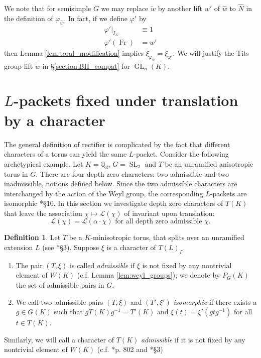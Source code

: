\documentclass{amsart}
\theoremstyle{plain}
\theoremstyle{definition}
\newtheorem{definition}[theorem]{Definition}
\numberwithin{equation}{section}
\DeclareMathOperator{\Fr}{Fr}
\DeclareMathOperator{\GL}{GL}
\DeclareMathOperator{\SL}{SL}
\newcommand{\QQ}{\mathbb{Q}}
\newcommand{\Lpack}{\mathcal{L}}
\begin{document}
We note that for semisimple $G$ we may replace $\tilde{w}$ by another
lift $w'$ of $\hat{w}$ to $\hat{N}$ in the definition of $\varphi_{\hat{w}}$.
In fact, if we define $\varphi'$ by
\begin{align*}
\varphi'|_{I_K} &\equiv 1 \\
\varphi'(\Fr) &= w'
\end{align*}
then Lemma \ref{lem:toral_modification} implies $\xi_{\varphi_{\hat{w}}} = \xi_{\varphi'}$.
We will justify the Tits group lift $\tilde{w}$ in \S\ref{section:BH_compat} for $\GL_n(K)$.

\section{$L$-packets fixed under translation by a character}\label{Q_T}

The general definition of rectifier is complicated by the fact that different
characters of a torus can yield the same $L$-packet.  Consider the following archetypical example.
Let $K = \QQ_3$, $G = \SL_2$ and $T$ be an unramified anisotropic torus in $G$.  There are four depth zero
characters: two admissible and two inadmissible, notions defined below.  Since the two admissible characters are interchanged
by the action of the Weyl group, the corresponding $L$-packets are isomorphic \cite{murnaghan:11}*{\S10}.
In this section we investigate depth zero characters of $T(K)$ that leave the association
$\chi \mapsto \Lpack(\chi)$ of \cite{reeder-debacker:09a} invariant upon translation:
$$\Lpack(\chi) = \Lpack(\alpha\cdot\chi) \mbox{ for all depth zero admissible $\chi$}.$$

\begin{definition} \label{def:admissible}
Let $T$ be a $K$-minisotropic torus, that splits over an unramified
extension $L$ (see \cite{reeder:08a}*{\S3}).  Suppose $\xi$ is a character of $T(L)_{\Gamma}$.
\begin{enumerate}
\item The pair $(T, \xi)$ is called \emph{admissible} if $\xi$ is not fixed
by any nontrivial element of $W(K)$ (c.f. Lemma \ref{lem:weyl_groups}); we
denote by $P_G(K)$ the set of admissible pairs in $G$.
\item We call two admissible pairs $(T, \xi)$ and $(T', \xi')$ \emph{isomorphic} if there
exists a $g \in G(K)$ such that $gT(K)g^{-1} = T'(K)$ and $\xi(t) = \xi'(gtg^{-1})$
for all $t \in T(K)$.
\end{enumerate}
Similarly, we will call a character of $T(K)$ \emph{admissible} if
it is not fixed by any nontrivial element of $W(K)$
(c.f. \cite{reeder-debacker:09a}*{p. 802} and \cite{reeder:08a}*{\S3})
\end{definition}
\end{document}
